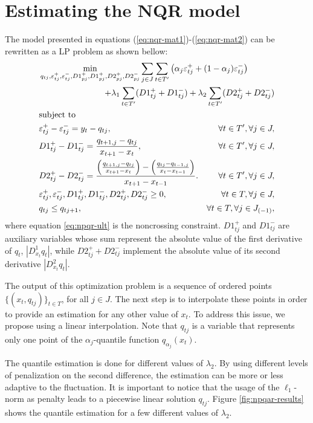 \section{Estimating the NQR model}

The model presented in equations (\ref{eq:nqr-mat1})-(\ref{eq:nqr-mat2}) can be rewritten as a LP problem as shown bellow:
\begin{align}
& \min_{q_{tj},\varepsilon_{t j}^{+},\varepsilon_{t j}^{-},D1^+_{pj}, D1^+_{pj},D2^+_{pj}, D2^-_{pj}} \sum_{j \in J} \sum_{t \in T'}\left({\alpha_j}\varepsilon_{tj}^{+}+(1-{\alpha_j})\varepsilon_{tj}^{-}\right) \span \nonumber \\
& \span    + \lambda_1\sum_{t \in T'}(D1_{tj}^+ + D1_{tj}^-) + \lambda_2\sum_{t \in T'}(D2_{tj}^+ + D2_{tj}^-) \label{eq:npqr1} \\
& \text{subject to} \span\\
&  \varepsilon_{tj}^{+}-\varepsilon_{tj}^{-}=y_{t}-q_{tj}, & \forall t \in T',\forall j \in J,\\
& D1_{tj}^+ - D1_{tj}^-=\frac{q_{t+1,j}-q_{tj}}{x_{t+1}-x_{t}},
    & \forall t \in T',\forall j \in J,\\   
& D2_{tj}^+ - D2_{tj}^-=\frac{\left(\frac{q_{t+1,j}-q_{tj}}{x_{t+1}-x_{t}}\right)-\left(\frac{q_{tj}-q_{t-1,j}}{x_{t}-x_{t-1}}\right)}{x_{t+1}- x_{t-1}}. & \forall t \in T',\forall j \in J,\\
& \varepsilon_{tj}^{+},\varepsilon_{tj}^{-},D1_{tj}^+, D1_{tj}^-, D2_{tj}^+, D2_{tj}^- \geq 0, & \forall t \in T,\forall j \in J,\\
& q_{t j} \leq q_{t j+1}, &  \forall t \in T, \forall j \in J_{(-1)} \label{eq:npqr-ult},
\end{align}
where equation \ref{eq:npqr-ult} is the noncrossing constraint. $D1_{tj}^+$ and $D1_{tj}^-$ are auxiliary variables whose sum represent the absolute value of the first derivative of $q_t$, $|D^1_{x_t}q_t|$, while $D2_{tj}^+ + D2_{tj}^-$ implement the absolute value of its second derivative $|D^2_{x_t}q_t|$.

The output of this optimization problem is a sequence of ordered points $\{(x_t, q_{tj})\}_{t \in T}$, for all $j \in J$. The next step is to interpolate these points in order to provide an estimation for any other value of $x_t$. To address this issue, we propose using a linear interpolation. Note that $q_{tj}$ is a variable that represents only one point of the $\alpha_j$-quantile function $q_{\alpha_j}(x_t)$. 

The quantile estimation is done for different values of $\lambda_2$. By using different levels of penalization on the second difference, the estimation can be more or less adaptive to the fluctuation. It is important to notice that the usage of the $\ell_1$-norm as penalty leads to a piecewise linear solution $q_{tj}$. %
Figure \ref{fig:npqar-results} shows the quantile estimation for a few different values of $\lambda_2$. 

